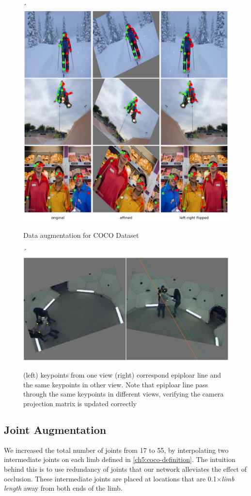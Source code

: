 \begin{figure}´
	\centering
	\includegraphics[width=0.7\columnwidth]{figures/ch5/coco-augmentation.png}
	\caption{Data augmentation for COCO Dataset} 
	\label{fig:ch5-coco-augmentation}
\end{figure}

\begin{figure}´
	\centering
	\includegraphics[width=0.7\columnwidth]{figures/ch5/panoptic-3d-epipolar-line.png}
	\caption{(left) keypoints from one view (right) correspond epiploar line and the same keypoints in other view. Note that epiploar line pass through the same keypoints in different views, verifying the camera projection matrix is updated correctly} 
	\label{fig:ch5-cmu-epipolar-line}
\end{figure}

\subsection{Joint Augmentation}
We increased the total number of joints from 17 to 55, by interpolating two intermediate joints on each limb defined in \ref{ch5:coco-definition}. The intuition behind this is to use redundancy of joints that our network alleviates the effect of occlusion. These intermediate joints are placed at locations that are 0.1$\times$\textit{limb length} away from both ends of the limb.